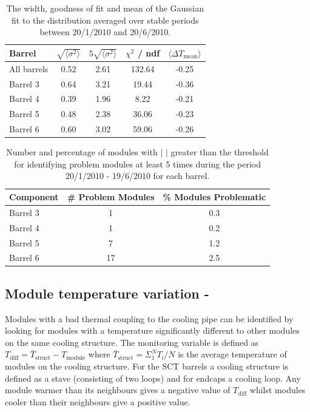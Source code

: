 \begin{table}
\centering
\begin{tabular}{ l | c  c  c  c }
\hline\hline
Barrel & $\sqrt{\langle \sigma ^ 2 \rangle }$ & $5\sqrt{\langle \sigma ^ 2 \rangle }$ & $\chi ^2 $  / ndf & $\langle \Delta T_{\mathrm{mean}} \rangle$ \\
\hline
All barrels & 0.52 & 2.61 & 132.64 & -0.25\\
Barrel 3 & 0.64 & 3.21 & 19.44 & -0.36 \\
Barrel 4 & 0.39 & 1.96 & 8.22 & -0.21 \\
Barrel 5 & 0.48 & 2.38 & 36.06 & -0.23 \\
Barrel 6 & 0.60 & 3.02 & 59.06 & -0.26 \\
\hline\hline
\end{tabular}
 \caption{The width, goodness of fit and mean of the Gaussian fit to the \deltat distribution averaged over stable periods between 20/1/2010 and 20/6/2010.}
	\label{table:dt_thresh}

\end{table}

\begin{table}
\centering
 \begin{tabular}{  l | c  c }
\hline\hline
Component & \# Problem Modules & \% Modules Problematic \\
\hline
Barrel 3 & 1 & 0.3 \\
Barrel 4 & 1 & 0.2 \\
Barrel 5 & 7 & 1.2 \\
Barrel 6 & 17 & 2.5 \\
\hline\hline
\end{tabular}
\caption{Number and percentage of modules with $|$ \deltat$|$ greater than the threshold for identifying problem modules at least 5 times during the period 20/1/2010 - 19/6/2010 for each barrel.}
\label{table:dt_num}
\end{table}

\subsection{Module temperature variation - \tdiff }

Modules with a bad thermal coupling to the cooling pipe can be identified by looking for modules with a temperature significantly different to other modules on the same cooling structure. The monitoring variable \tdiff is defined as $T_{\mathrm{diff}}  = \bar T_{\mathrm{struct}} - T_{\mathrm{module}}$ where $\bar T_{\mathrm{struct}} = \Sigma^N_1 T_{\mathrm{i}}/N $ is the average temperature of modules on the cooling structure. For the SCT barrels a cooling structure is defined as a stave (consisting of two loops) and for endcaps a cooling loop. Any module warmer than its neighbours gives a negative value of $T_{\mathrm{diff}}$ whilst modules cooler than their neighbours give a positive value.

